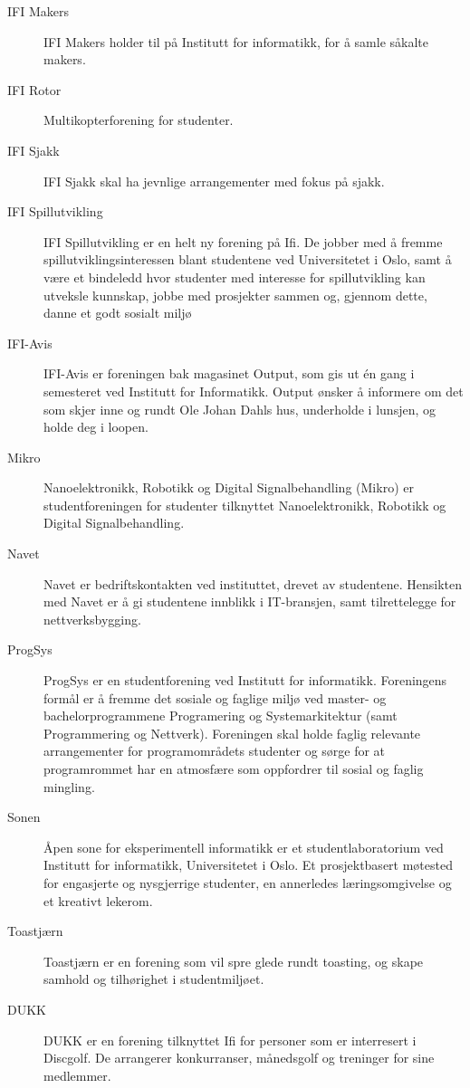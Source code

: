\begin{description}
	\item[IFI Makers] IFI Makers holder til på Institutt for informatikk, for å samle såkalte makers.
	\item[IFI Rotor] Multikopterforening for studenter.
	\item[IFI Sjakk] IFI Sjakk skal ha jevnlige arrangementer med fokus på sjakk.
	\item[IFI Spillutvikling] IFI Spillutvikling er en helt ny forening på Ifi. De jobber med å fremme spillutviklingsinteressen blant studentene ved Universitetet i Oslo, samt å være et bindeledd hvor studenter med interesse for spillutvikling kan utveksle kunnskap, jobbe med prosjekter sammen og, gjennom dette, danne et godt sosialt miljø
	\item[IFI-Avis] IFI-Avis er foreningen bak magasinet Output, som gis ut én gang i semesteret ved Institutt for Informatikk. Output ønsker å informere om det som skjer inne og rundt Ole Johan Dahls hus, underholde i lunsjen, og holde deg i loopen.
	\item[Mikro] Nanoelektronikk, Robotikk og Digital Signalbehandling (Mikro) er studentforeningen for studenter tilknyttet Nanoelektronikk, Robotikk og Digital Signalbehandling.
	\item[Navet] Navet er bedriftskontakten ved instituttet, drevet av studentene. Hensikten med Navet er å gi studentene innblikk i IT-bransjen, samt tilrettelegge for nettverksbygging.
	\item[ProgSys] ProgSys er en studentforening ved Institutt for informatikk. Foreningens formål er å fremme det sosiale og faglige miljø ved master- og bachelorprogrammene Programering og Systemarkitektur (samt Programmering og Nettverk). Foreningen skal holde faglig relevante arrangementer for programområdets studenter og sørge for at programrommet har en atmosfære som oppfordrer til sosial og faglig mingling.
	\item[Sonen] Åpen sone for eksperimentell informatikk er et studentlaboratorium ved Institutt for informatikk, Universitetet i Oslo. Et prosjektbasert møtested for engasjerte og nysgjerrige studenter, en annerledes læringsomgivelse og et kreativt lekerom.
	\item[Toastjærn] Toastjærn er en forening som vil spre glede rundt toasting, og skape samhold og tilhørighet i studentmiljøet.
	\item[DUKK] DUKK er en forening tilknyttet Ifi for personer som er interresert i Discgolf. De arrangerer konkurranser, månedsgolf og treninger for sine medlemmer.
\end{description}

